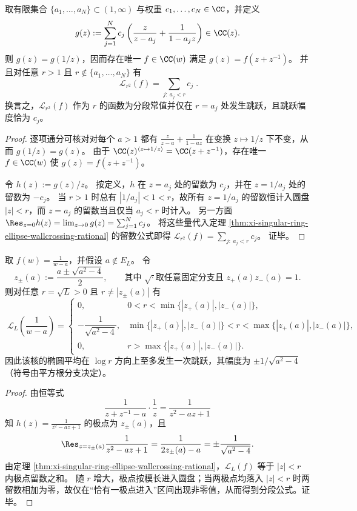 \begin{proposition}\label{prop:xi-ellipse-wallcrossing-realize-finite-jump-data}
取有限集合 \(\{a_1,\dots,a_N\}\subset(1,\infty)\) 与权重 \(c_1,\dots,c_N\in\CC\)，并定义
\[
g(z):=\sum_{j=1}^N c_j\left(\frac{z}{z-a_j}+\frac{1}{1-a_j z}\right)\in\CC(z).
\]
则 \(g(z)=g(1/z)\)，因而存在唯一 \(f\in\CC(w)\) 满足 \(g(z)=f(z+z^{-1})\)。
并且对任意 \(r>1\) 且 \(r\notin\{a_1,\dots,a_N\}\) 有
\[
\boxed{\;
\mathcal{L}_{r^2}(f)=\sum_{j:\ a_j<r} c_j\; }.
\]
换言之，\(\mathcal{L}_{r^2}(f)\) 作为 \(r\) 的函数为分段常值并仅在 \(r=a_j\) 处发生跳跃，且跳跃幅度恰为 \(c_j\)。
\end{proposition}
\begin{proof}
逐项通分可核对对每个 \(a>1\) 都有
\(
\frac{z}{z-a}+\frac{1}{1-a z}
\)
在变换 \(z\mapsto 1/z\) 下不变，从而 \(g(1/z)=g(z)\)。
由于 \(\CC(z)^{\langle z\mapsto 1/z\rangle}=\CC(z+z^{-1})\)，存在唯一 \(f\in\CC(w)\) 使 \(g(z)=f(z+z^{-1})\)。
\par
令 \(h(z):=g(z)/z\)。
按定义，\(h\) 在 \(z=a_j\) 处的留数为 \(c_j\)，并在 \(z=1/a_j\) 处的留数为 \(-c_j\)。
当 \(r>1\) 时总有 \(|1/a_j|<1<r\)，故所有 \(z=1/a_j\) 的留数恒计入圆盘 \(|z|<r\)，而 \(z=a_j\) 的留数当且仅当 \(a_j<r\) 时计入。
另一方面 \(\Res_{z=0}h(z)=\lim_{z\to 0}g(z)=\sum_{j=1}^N c_j\)。
将这些量代入定理 \ref{thm:xi-singular-ring-ellipse-wallcrossing-rational} 的留数公式即得
\(
\mathcal{L}_{r^2}(f)=\sum_{j:\ a_j<r}c_j
\)。
证毕。
\end{proof}

\begin{corollary}\label{cor:xi-singular-ring-ellipse-simple-pole-response}
取 \(f(w)=\frac{1}{w-a}\)，并假设 \(a\notin E_L\)。
令
\[
z_\pm(a):=\frac{a\pm\sqrt{a^2-4}}{2},
\qquad
\text{其中 }\sqrt{\cdot}\text{取任意固定分支且 }z_+(a)z_-(a)=1.
\]
则对任意 \(r=\sqrt{L}>0\) 且 \(r\neq |z_\pm(a)|\) 有
\[
\boxed{\;
\mathcal{L}_L\!\left(\frac{1}{w-a}\right)=
\begin{cases}
0, & 0<r<\min\{|z_+(a)|,|z_-(a)|\},\\[4pt]
-\dfrac{1}{\sqrt{a^2-4}}, & \min\{|z_+(a)|,|z_-(a)|\}<r<\max\{|z_+(a)|,|z_-(a)|\},\\[8pt]
0, & r>\max\{|z_+(a)|,|z_-(a)|\}.
\end{cases}}
\]
因此该核的椭圆平均在 \(\log r\) 方向上至多发生一次跳跃，其幅度为 \(\pm 1/\sqrt{a^2-4}\)（符号由平方根分支决定）。
\end{corollary}
\begin{proof}
由恒等式
\[
\frac{1}{z+z^{-1}-a}\cdot\frac{1}{z}=\frac{1}{z^2-a z+1}
\]
知 \(h(z)=\frac{1}{z^2-a z+1}\) 的极点为 \(z_\pm(a)\)，且
\[
\Res_{z=z_\pm(a)}\frac{1}{z^2-a z+1}
=\frac{1}{2z_\pm(a)-a}
=\pm\frac{1}{\sqrt{a^2-4}}.
\]
由定理 \ref{thm:xi-singular-ring-ellipse-wallcrossing-rational}，\(\mathcal{L}_L(f)\) 等于 \(|z|<r\) 内极点留数之和。
随 \(r\) 增大，极点按模长进入圆盘；当两极点均落入 \(|z|<r\) 时两留数相加为零，故仅在“恰有一极点进入”区间出现非零值，从而得到分段公式。证毕。
\end{proof}

